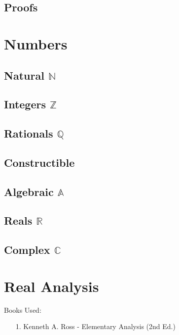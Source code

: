 \documentclass[12pt, english]{book}
\theoremstyle{break}
\theoremstyle{plain}
\begin{document}
	\chapter{Proofs}
	
	
	\part{Numbers}
	
	\chapter{Natural $\mathbb{N}$}
	
	\chapter{Integers $\mathbb{Z}$}
	
	\chapter{Rationals $\mathbb{Q}$}
	
	\chapter{Constructible}
	
	\chapter{Algebraic $\mathbb{A}$}
	
	\chapter{Reals $\mathbb{R}$}
	
	\chapter{Complex $\mathbb{C}$}
	

	
	\part{Real Analysis}
	Books Used: 
	\begin{itemize}
		\item[1.] Kenneth A. Ross - Elementary Analysis (2nd Ed.) \cite{Ross.K-Elementary-Analysis-2013}
	\end{itemize}
	
\end{document}

